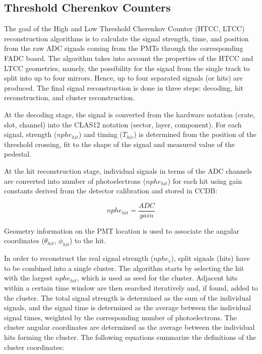 \subsection{Threshold Cherenkov Counters}

The goal of the High and Low Threshold Cherenkov Counter (HTCC, LTCC) reconstruction algorithms is to
calculate the signal strength, time, and position from the
raw ADC signals coming from the PMTs through the corresponding FADC board. The algorithm takes into account
the properties of the HTCC and LTCC geometries, namely, the possibility for the signal from the single track to split into
up to four mirrors.
Hence, up to four separated signals (or hits) are produced. The final signal reconstruction is done in three
steps: decoding, hit reconstruction, and cluster reconstruction.

At the decoding stage, the signal is converted from the hardware notation (crate, slot, channel) into the CLAS12
notation (sector, layer, component).  For each signal, strength ($nphe_{hit}$) and timing ($T_{hir}$) is determined
from the position of the threshold crossing, fit to the shape of the signal and measured value of the pedestal.

At the hit reconstruction stage, individual signals in terms of the ADC channels are converted into number of photoelectrons ($nphe_{hit}$) for each hit using gain constants derived from the detector calibration and stored in CCDB:

\begin{equation}
nphe_{hit} = \frac{ADC}{gain}
\end{equation}

Geometry information on the PMT location is used to associate the angular coordinates ($\theta_{hit}$, $\phi_{hit}$) to the hit.

In order to reconstruct the real signal strength ($nphe_c$),  split signals (hits) have to be combined into a single
cluster. The algorithm starts by selecting the hit with the largest $nphe_{hit}$, which is used as seed for the cluster. Adjacent hits within a certain time window are then searched iteratively and, if found, added to the cluster. The total signal strength is determined as the sum of the individual signals, and the signal time is determined as the average between the individual signal times, weighted by the corresponding number of photoelectrons. The cluster
angular coordinates are determined as the average between the individual hits forming the cluster. The following equations summarize the definitions of the cluster coordinates:

